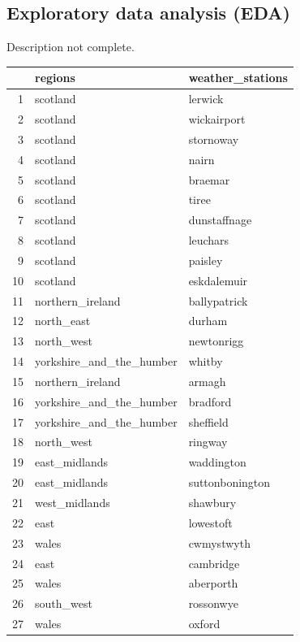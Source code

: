 \documentclass[12pt, oneside, openany]{book}
\begin{document}
\bigskip
\bigskip
\subsection*{Exploratory data analysis (EDA)}
\color{red}Description not complete\color{black}.

\begin{table}[ht]
\centering
\begin{tabular}{rll}
  \hline
 & regions & weather\_stations \\ 
  \hline
1 & scotland & lerwick \\ 
  2 & scotland & wickairport \\ 
  3 & scotland & stornoway \\ 
  4 & scotland & nairn \\ 
  5 & scotland & braemar \\ 
  6 & scotland & tiree \\ 
  7 & scotland & dunstaffnage \\ 
  8 & scotland & leuchars \\ 
  9 & scotland & paisley \\ 
  10 & scotland & eskdalemuir \\ 
  11 & northern\_ireland & ballypatrick \\ 
  12 & north\_east & durham \\ 
  13 & north\_west & newtonrigg \\ 
  14 & yorkshire\_and\_the\_humber & whitby \\ 
  15 & northern\_ireland & armagh \\ 
  16 & yorkshire\_and\_the\_humber & bradford \\ 
  17 & yorkshire\_and\_the\_humber & sheffield \\ 
  18 & north\_west & ringway \\ 
  19 & east\_midlands & waddington \\ 
  20 & east\_midlands & suttonbonington \\ 
  21 & west\_midlands & shawbury \\ 
  22 & east & lowestoft \\ 
  23 & wales & cwmystwyth \\ 
  24 & east & cambridge \\ 
  25 & wales & aberporth \\ 
  26 & south\_west & rossonwye \\ 
  27 & wales & oxford \\ 

\end{tabular}
\end{table}
\end{document}
